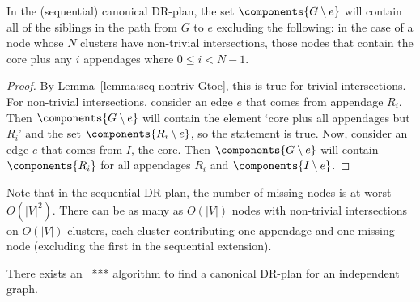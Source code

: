 \begin{lemma}\label{lemma:seq-Gtoe}
    In the (sequential) canonical DR-plan, the set $\components{G\setminus e}$ will contain all of the siblings in the path from $G$ to $e$ excluding the following: in the case of a node whose $N$ clusters have non-trivial intersections, those nodes that contain the core plus any $i$ appendages where $0\leq i<N-1$.
\end{lemma}

\begin{proof}
    By Lemma~\ref{lemma:seq-nontriv-Gtoe}, this is true for trivial intersections. For non-trivial intersections, consider an edge $e$ that comes from appendage $R_i$. Then $\components{G\setminus e}$ will contain the element `core plus all appendages but $R_i$' and the set $\components{R_i\setminus e}$, so the statement is true. Now, consider an edge $e$ that comes from $I$, the core. Then $\components{G\setminus e}$ will contain $\components{R_i}$ for all appendages $R_i$ and $\components{I\setminus e}$.
\end{proof}

Note that in the sequential DR-plan, the number of missing nodes is at worst $O(|V|^2)$. There can be as many as $O(|V|)$ nodes with non-trivial intersections on $O(|V|)$ clusters, each cluster contributing one appendage and one missing node (excluding the first in the sequential extension).

\begin{theorem}\label{theorem:algo_complexity}
    There exists an \ComplexityCanDRPV\ *** algorithm to find a canonical DR-plan for an independent graph.
\end{theorem}

